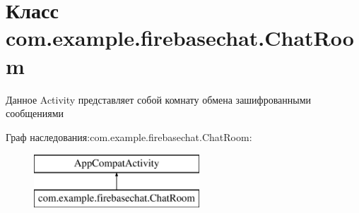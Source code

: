 \hypertarget{classcom_1_1example_1_1firebasechat_1_1_chat_room}{}\section{Класс com.\+example.\+firebasechat.\+Chat\+Room}
\label{classcom_1_1example_1_1firebasechat_1_1_chat_room}


Данное Activity представляет собой комнату обмена зашифрованными сообщениями  


Граф наследования\+:com.\+example.\+firebasechat.\+Chat\+Room\+:\begin{figure}[H]
\begin{center}
\leavevmode
\includegraphics[height=2.000000cm]{classcom_1_1example_1_1firebasechat_1_1_chat_room}
\end{center}
\end{figure}
